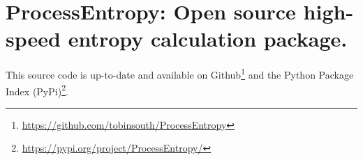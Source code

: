 \chapter{ProcessEntropy: Open source high-speed entropy calculation package.\label{app:code}}

This source code is up-to-date and available on Github\footnote{\url{https://github.com/tobinsouth/ProcessEntropy}} and the Python Package Index (PyPi)\footnote{\url{https://pypi.org/project/ProcessEntropy/}}.















